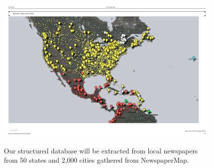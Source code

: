 \documentclass[11pt]{article}
\begin{document}

\begin{figure}
\includegraphics[width=\linewidth]{newspapermap.pdf}
\label{map}
\caption{Our structured database will be extracted from local newspapers from 50 states and 2,000 cities gathered from NewspaperMap.}
\end{figure}

\end{document}
